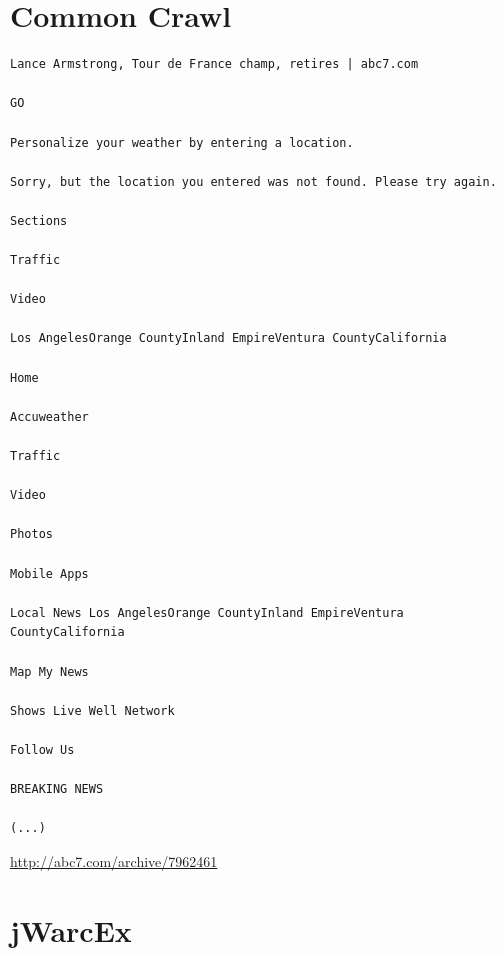 \documentclass[a4paper,12pt,titlepage=false]{scrreprt}
\begin{document}
\section{Common Crawl}

\begin{lstlisting}[breaklines=true]
Lance Armstrong, Tour de France champ, retires | abc7.com

GO

Personalize your weather by entering a location.

Sorry, but the location you entered was not found. Please try again.

Sections

Traffic

Video

Los AngelesOrange CountyInland EmpireVentura CountyCalifornia

Home

Accuweather

Traffic

Video

Photos

Mobile Apps

Local News Los AngelesOrange CountyInland EmpireVentura CountyCalifornia

Map My News

Shows Live Well Network

Follow Us

BREAKING NEWS

(...)
\end{lstlisting}

\vspace{.2cm}
\url{http://abc7.com/archive/7962461}

\section{jWarcEx}
\end{document}
